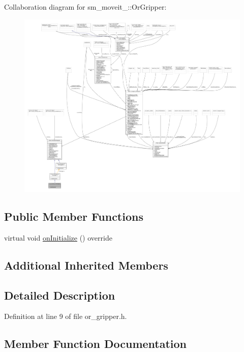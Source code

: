 Collaboration diagram for sm\+\_\+moveit\+\_\+:\+:Or\+Gripper\+:
\nopagebreak
\begin{figure}[H]
\begin{center}
\leavevmode
\includegraphics[width=350pt]{classsm__moveit__3_1_1OrGripper__coll__graph}
\end{center}
\end{figure}
\subsection*{Public Member Functions}
\begin{DoxyCompactItemize}
\item 
virtual void \hyperlink{classsm__moveit__3_1_1OrGripper_a1f5946b6a65119a99819eef3ca4a83e2}{on\+Initialize} () override
\end{DoxyCompactItemize}
\subsection*{Additional Inherited Members}


\subsection{Detailed Description}


Definition at line 9 of file or\+\_\+gripper.\+h.



\subsection{Member Function Documentation}
\mbox{\label{classsm__moveit__3_1_1OrGripper_a1f5946b6a65119a99819eef3ca4a83e2}} 

